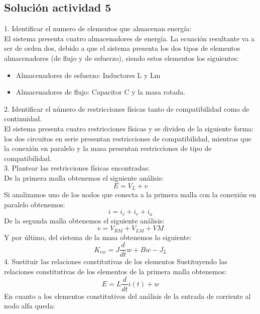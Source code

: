 \subsection{Solución actividad 5}
1. Identificar el numero de elementos que almacenan energía:\\
El sistema presenta cuatro almacenadores de energía. La ecuación resultante va a ser de orden dos, debido a que el sistema presenta los dos tipos de elementos almacenadores (de flujo y de esfuerzo), siendo estos elementos los siguientes:\\
\begin{itemize}
\item Almacenadores de esfuerzo: Inductores L y Lm
\item Almacenadores de flujo: Capacitor C y la masa rotada.
\end{itemize}
2. Identificar el número de restricciones físicas tanto de compatibilidad como de continuidad.\\
El sistema presenta cuatro restricciones físicas y se dividen de la siguiente forma: los dos circuitos en serie presentan restricciones de compatibilidad, mientras que la conexión en paralelo y la masa presentan restricciones de tipo de compatibilidad.\\
3. Plantear las restricciones físicas encontradas:\\
De la primera malla obtenemos el siguiente análisis:\\
\begin{equation}
E=V_L+v
\end{equation}
Si analizamos uno de los nodos que conecta a la primera malla con la conexión en paralelo obtenemos:\\
\begin{equation}
i=i_c+i_r+i_a
\end{equation}
De la segunda malla obtenemos el siguiente análisis:
\begin{equation}
v=V_{RM}+V_{LM}+VM
\end{equation}
Y por último, del sistema de la masa obtenemos lo siguiente:
\begin{equation}
K_{ew}=J\frac{d}{dt}w+Bw-J_L
\end{equation}
4. Sustituir las relaciones constitutivas de los elementos
Sustituyendo las relaciones constitutivas de los elementos de la primera malla obtenemos:
\begin{equation}
E=L\frac{d}{dt}i(t)+w
\end{equation}
En cuanto a los elementos constitutivos del análisis de la entrada de corriente al nodo alfa queda:
